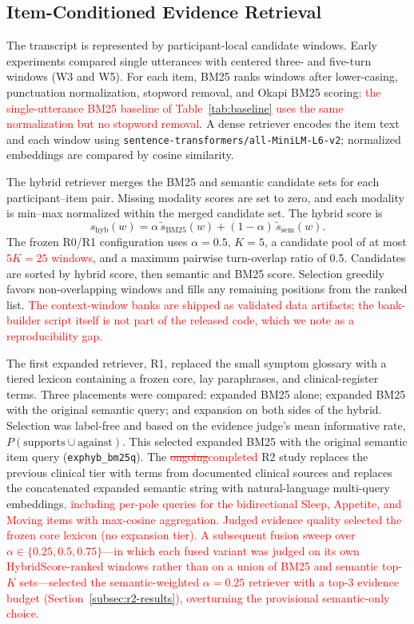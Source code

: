 \documentclass{article}
\DeclareRobustCommand{\rev}[1]{\textcolor{red}{#1}}
\DeclareRobustCommand{\del}[1]{\textcolor{red}{\sout{#1}}}
\begin{document}
\subsection{Item-Conditioned Evidence Retrieval}
\label{subsec:retrieval}
The transcript is represented by participant-local candidate windows. Early experiments compared single utterances with centered three- and five-turn windows (W3 and W5). For each item, BM25 ranks windows after lower-casing, punctuation normalization, stopword removal, and Okapi BM25 scoring\rev{; the single-utterance BM25 baseline of Table~\ref{tab:baseline} uses the same normalization but no stopword removal}. A dense retriever encodes the item text and each window using \texttt{sentence-transformers/all-MiniLM-L6-v2}; normalized embeddings are compared by cosine similarity.

The hybrid retriever merges the BM25 and semantic candidate sets for each participant--item pair. Missing modality scores are set to zero, and each modality is min--max normalized within the merged candidate set. The hybrid score is
\begin{equation}
 s_{\mathrm{hyb}}(w)=\alpha\,\tilde{s}_{\mathrm{BM25}}(w)+(1-\alpha)\,\tilde{s}_{\mathrm{sem}}(w).
\end{equation}
The frozen R0/R1 configuration uses $\alpha=0.5$, $K=5$, a candidate pool of at most \rev{$5K=25$ windows}, and a maximum pairwise turn-overlap ratio of 0.5. Candidates are sorted by hybrid score, then semantic and BM25 score. Selection greedily favors non-overlapping windows and fills any remaining positions from the ranked list. \rev{The context-window banks are shipped as validated data artifacts; the bank-builder script itself is not part of the released code, which we note as a reproducibility gap.}

The first expanded retriever, R1, replaced the small symptom glossary with a tiered lexicon containing a frozen core, lay paraphrases, and clinical-register terms. Three placements were compared: expanded BM25 alone; expanded BM25 with the original semantic query; and expansion on both sides of the hybrid. Selection was label-free and based on the evidence judge's mean informative rate, $P(\text{supports}\cup\text{against})$. This selected expanded BM25 with the original semantic item query (\texttt{exphyb\_bm25q}). The \del{ongoing}\rev{completed} R2 study replaces the previous clinical tier with terms from documented clinical sources and replaces the concatenated expanded semantic string with natural-language multi-query embeddings\rev{, including per-pole queries for the bidirectional Sleep, Appetite, and Moving items with max-cosine aggregation. Judged evidence quality selected the frozen core lexicon (no expansion tier). A subsequent fusion sweep over $\alpha\in\{0.25,0.5,0.75\}$---in which each fused variant was judged on its own HybridScore-ranked windows rather than on a union of BM25 and semantic top-$K$ sets---selected the semantic-weighted $\alpha=0.25$ retriever with a top-3 evidence budget (Section~\ref{subsec:r2-results}), overturning the provisional semantic-only choice.}
\end{document}
